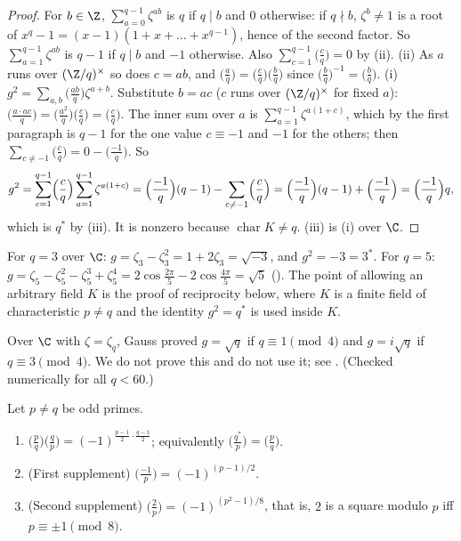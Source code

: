 \begin{proof}
For $b\in\Z$, $\sum_{a=0}^{q-1}\zeta^{ab}$ is $q$ if $q\mid b$ and $0$ otherwise: if $q\nmid b$, $\zeta^b\ne1$ is a root of $x^q-1=(x-1)(1+x+\dots+x^{q-1})$, hence of the
second factor. So $\sum_{a=1}^{q-1}\zeta^{ab}$ is $q-1$ if $q\mid b$ and $-1$ otherwise. Also $\sum_{c=1}^{q-1}\bigl(\frac cq\bigr)=0$ by
(ii).
(ii) As $a$ runs over $(\Z/q)^\times$ so does $c=ab$, and $\bigl(\frac aq\bigr)=\bigl(\frac cq\bigr)\bigl(\frac bq\bigr)$ since $\bigl(\frac bq\bigr)^{-1}=\bigl(\frac bq\bigr)$.
(i) $g^2=\sum_{a,b}\bigl(\frac{ab}q\bigr)\zeta^{a+b}$. Substitute $b=ac$ ($c$ runs over $(\Z/q)^\times$ for fixed $a$): $\bigl(\frac{a\cdot ac}q\bigr)=\bigl(\frac{a^2}q\bigr)\bigl(\frac cq\bigr)=\bigl(\frac cq\bigr)$. The
inner sum over $a$ is $\sum_{a=1}^{q-1}\zeta^{a(1+c)}$, which by the first paragraph is $q-1$ for the one value $c\equiv-1$ and $-1$ for the others; then
$\sum_{c\ne-1}\bigl(\frac cq\bigr)=0-\bigl(\frac{-1}q\bigr)$. So
\[
g^2=\sum_{c=1}^{q-1}\Bigl(\frac cq\Bigr)\sum_{a=1}^{q-1}\zeta^{a(1+c)}=\Bigl(\frac{-1}q\Bigr)(q-1)-\sum_{c\ne-1}\Bigl(\frac cq\Bigr)=\Bigl(\frac{-1}q\Bigr)(q-1)+\Bigl(\frac{-1}q\Bigr)=\Bigl(\frac{-1}q\Bigr)q,
\]
which is $q^*$ by (iii). It is nonzero because $\operatorname{char}K\ne q$. (iii) is (i) over $\C$.
\end{proof}

For $q=3$ over $\C$: $g=\zeta_3-\zeta_3^2=1+2\zeta_3=\sqrt{-3}$, and $g^2=-3=3^*$. For $q=5$: $g=\zeta_5-\zeta_5^2-\zeta_5^3+\zeta_5^4=2\cos\frac{2\pi}5-2\cos\frac{4\pi}5=\sqrt5$
(). The point of allowing an arbitrary field $K$ is the proof of reciprocity below, where $K$ is a finite field of
characteristic $p\ne q$ and the identity $g^2=q^*$ is used inside $K$.

\begin{remark}\label{rem:rings:gauss-sign}
Over $\C$ with $\zeta=\zeta_q$, Gauss proved $g=\sqrt q$ if $q\equiv1\pmod4$ and $g=i\sqrt q$ if $q\equiv3\pmod4$. We do not prove this and do not use it;
see \cite[Chapter 6, Section 6.4]{IrelandRosen}. (Checked numerically for all $q<60$.)
\end{remark}

\begin{theorem}\label{thm:rings:qr}
Let $p\ne q$ be odd primes.
\begin{enumerate}[label=(\roman*)]
\item $\bigl(\frac pq\bigr)\bigl(\frac qp\bigr)=(-1)^{\frac{p-1}2\cdot\frac{q-1}2}$; equivalently $\bigl(\frac{q^*}p\bigr)=\bigl(\frac pq\bigr)$.
\item (First supplement) $\bigl(\frac{-1}p\bigr)=(-1)^{(p-1)/2}$.
\item (Second supplement) $\bigl(\frac2p\bigr)=(-1)^{(p^2-1)/8}$, that is, $2$ is a square modulo $p$ iff $p\equiv\pm1\pmod8$.
\end{enumerate}
\end{theorem}

